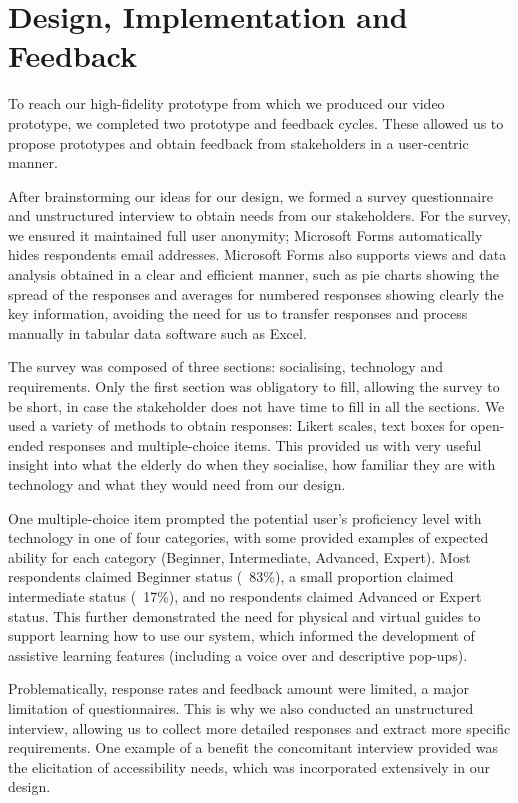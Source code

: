 \documentclass[12pt,a4paper]{article}
\begin{document}
\section{Design, Implementation and Feedback}

To reach our high-fidelity prototype from which we produced our video prototype, we completed two prototype and feedback cycles. These allowed us to propose prototypes and obtain feedback from stakeholders in a user-centric manner.  

After brainstorming our ideas for our design, we formed a survey questionnaire and unstructured interview to obtain needs from our stakeholders. For the survey, we ensured it maintained full user anonymity; Microsoft Forms automatically hides respondents email addresses. Microsoft Forms also supports views and data analysis obtained in a clear and efficient manner, such as pie charts showing the spread of the responses and averages for numbered responses showing clearly the key information, avoiding the need for us to transfer responses and process manually in tabular data software such as Excel. 

The survey was composed of three sections: socialising, technology and requirements. Only the first section was obligatory to fill, allowing the survey to be short, in case the stakeholder does not have time to fill in all the sections. We used a variety of methods to obtain responses: Likert scales, text boxes for open-ended responses and multiple-choice items. This provided us with very useful insight into what the elderly do when they socialise, how familiar they are with technology and what they would need from our design.  

One multiple-choice item prompted the potential user’s proficiency level with technology in one of four categories, with some provided examples of expected ability for each category (Beginner, Intermediate, Advanced, Expert). Most respondents claimed Beginner status (~83\%), a small proportion claimed intermediate status (~17\%), and no respondents claimed Advanced or Expert status. This further demonstrated the need for physical and virtual guides to support learning how to use our system, which informed the development of assistive learning features (including a voice over and descriptive pop-ups). 

Problematically, response rates and feedback amount were limited, a major limitation of questionnaires. This is why we also conducted an unstructured interview, allowing us to collect more detailed responses and extract more specific requirements. One example of a benefit the concomitant interview provided was the elicitation of accessibility needs, which was incorporated extensively in our design.  
\end{document}
